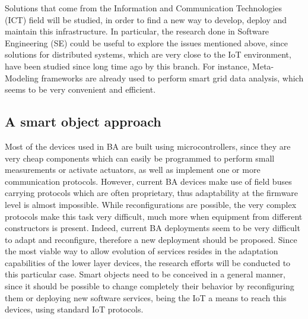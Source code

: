 Solutions that come from the Information and Communication Technologies (ICT) field will be studied, in order to find a new way to develop, deploy and maintain this infrastructure.
In particular, the research done in Software Engineering (SE) could be useful to explore the issues mentioned above, since solutions for distributed systems, which are very close to the IoT environment, have been studied since long time ago by this branch.
For instance, Meta-Modeling frameworks are already used to perform smart grid data analysis\cite{hartmann2014realisticsmartgrid}, which seems to be very convenient and efficient.

\subsection{A smart object approach}
Most of the devices used in BA are built using microcontrollers, since they are very cheap components which can easily be programmed to perform small measurements or activate actuators, as well as implement one or more communication protocols.
However, current BA devices make use of field buses carrying protocols which are often proprietary, thus adaptability at the firmware level is almost impossible.
While reconfigurations are possible, the very complex protocols make this task very difficult, much more when equipment from different constructors is present.
Indeed, current BA deployments seem to be very difficult to adapt and reconfigure, therefore a new deployment should be proposed.
Since the most viable way to allow evolution of services resides in the adaptation capabilities of the lower layer devices, the research efforts will be conducted to this particular case.
Smart objects need to be conceived in a general manner, since it should be possible to change completely their behavior by reconfiguring them or deploying new software services, being the IoT a means to reach this devices, using standard IoT protocols.



